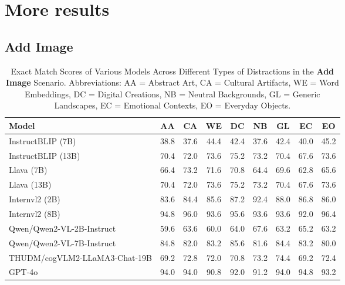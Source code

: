 \section{More results}
\label{sec:appendix-more-results}

\subsection{Add Image}
\begin{table*}[H]
  \centering
  \caption{Exact Match Scores of Various Models Across Different Types of Distractions in the \textbf{Add Image} Scenario. Abbreviations: AA = Abstract Art, CA = Cultural Artifacts, WE = Word Embeddings, DC = Digital Creations, NB = Neutral Backgrounds, GL = Generic Landscapes, EC = Emotional Contexts, EO = Everyday Objects.}
  \label{tab:performance_metrics_details_add_image}
  \begin{tabular}{l *{8}{S[table-format=2.1]}}
    \toprule
    \textbf{Model} & \textbf{AA} & \textbf{CA} & \textbf{WE} & \textbf{DC} & \textbf{NB} & \textbf{GL} & \textbf{EC} & \textbf{EO} \\
    \midrule
    InstructBLIP (7B)             & 38.8 & 37.6 & 44.4 & 42.4 & 37.6 & 42.4 & 40.0 & 45.2 \\
    InstructBLIP (13B)            & 70.4 & 72.0 & 73.6 & 75.2 & 73.2 & 70.4 & 67.6 & 73.6 \\
    Llava (7B)                    & 66.4 & 73.2 & 71.6 & 70.8 & 64.4 & 69.6 & 62.8 & 65.6 \\
    Llava (13B)                   & 70.4 & 72.0 & 73.6 & 75.2 & 73.2 & 70.4 & 67.6 & 73.6 \\
    Internvl2 (2B)                & 83.6 & 84.4 & 85.6 & 87.2 & 92.4 & 88.0 & 86.8 & 86.0 \\
    Internvl2 (8B)                & 94.8 & 96.0 & 93.6 & 95.6 & 93.6 & 93.6 & 92.0 & 96.4 \\
    Qwen/Qwen2-VL-2B-Instruct      & 59.6 & 63.6 & 60.0 & 64.0 & 67.6 & 63.2 & 65.2 & 63.2 \\
    Qwen/Qwen2-VL-7B-Instruct      & 84.8 & 82.0 & 83.2 & 85.6 & 81.6 & 84.4 & 83.2 & 80.0 \\
    THUDM/cogVLM2-LLaMA3-Chat-19B & 69.2 & 72.8 & 72.0 & 70.8 & 73.2 & 74.4 & 69.2 & 72.4 \\
     GPT-4o                       & 94.0 & 94.0 & 90.8 & 92.0 & 91.2 & 94.0 & 94.8 & 93.2 \\
    \bottomrule
  \end{tabular}
\end{table*}




